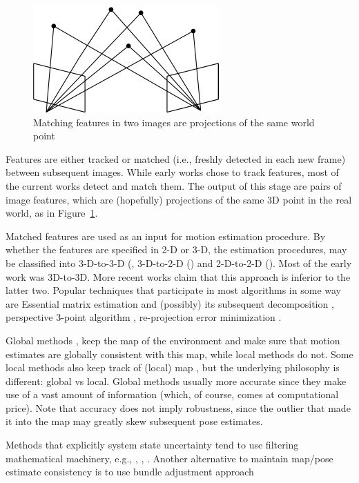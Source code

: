 \documentclass{bmvc2k}
\begin{document}
\begin{figure}
  \centering
  \includegraphics{5ptm2}
  \caption{Matching features in two images are projections of the same
    world point}
  \label{fig:5ptm}
\end{figure}

Features are either tracked \cite{Hedborg2009} or matched
\cite{Geiger2011} (i.e., freshly detected in each new frame) between
subsequent images. While early works chose to track features, most of
the current works detect and match them. The output of this stage are
pairs of image features, which are (hopefully) projections of the same
3D point in the real world, as in Figure~\ref{fig:5ptm}.

Matched features are used as an input for motion estimation procedure.
By whether the features are specified in 2-D or 3-D, the estimation
procedures, may be classified into 3-D-to-3-D (\cite{Milella2006},
3-D-to-2-D (\cite{Geiger2011}) and 2-D-to-2-D
(\cite{Nister2004}). Most of the early work was 3D-to-3D.  More recent
works \cite{Nister2004} claim that this approach is inferior to the
latter two. Popular techniques that participate in most algorithms in
some way are Essential matrix estimation and (possibly) its subsequent
decomposition \cite{Nister2004}, perspective 3-point algorithm
\cite{Kneip1991}, re-projection error minimization \cite{Geiger2011}.

Global methods \cite{Klein2007}, \cite{Newcombe2011} keep the map of
the environment and make sure that motion estimates are globally
consistent with this map, while local methods do not.  Some local
methods \cite{Badino2013} also keep track of (local) map , but the
underlying philosophy is different: global vs local.  Global methods
usually more accurate since they make use of a vast amount of
information (which, of course, comes at computational price).  Note
that accuracy does not imply robustness, since the outlier that made
it into the map may greatly skew subsequent pose estimates.

Methods that explicitly system state uncertainty tend to use filtering
mathematical machinery, e.g., \cite{Konolige2010}, \cite{Olson2003},
\cite{Kaess2008}.  Another alternative to maintain map/pose estimate
consistency is to use bundle adjustment approach \cite{Triggs2000}
\end{document}
